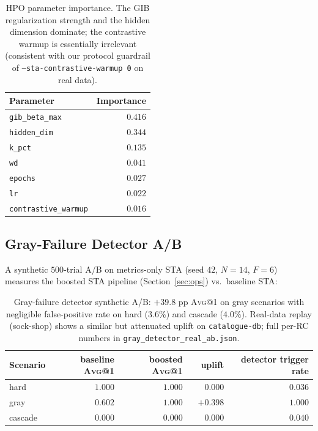 \documentclass[11pt,a4paper]{article}
\makeatletter
\newcommand{\Avg}[1]{\textsc{Avg}@{#1}}
\newcommand{\STA}{\textsc{STA}}
\makeatother
\begin{document}
\begin{table}[h]
\centering\small
\begin{tabular}{lr}
\toprule
\textbf{Parameter} & \textbf{Importance} \\
\midrule
\texttt{gib\_beta\_max} & $0.416$ \\
\texttt{hidden\_dim}    & $0.344$ \\
\texttt{k\_pct}         & $0.135$ \\
\texttt{wd}             & $0.041$ \\
\texttt{epochs}         & $0.027$ \\
\texttt{lr}             & $0.022$ \\
\texttt{contrastive\_warmup} & $0.016$ \\
\bottomrule
\end{tabular}
\caption{HPO parameter importance. The GIB regularization strength and the
hidden dimension dominate; the contrastive warmup is essentially irrelevant
(consistent with our protocol guardrail of \texttt{--sta-contrastive-warmup 0}
on real data).}
\label{tab:hpo}
\end{table}

\subsection{Gray-Failure Detector A/B}

A synthetic $500$-trial A/B on metrics-only \STA{} (seed $42$, $N{=}14$,
$F{=}6$) measures the boosted \STA{} pipeline (Section~\ref{sec:ops}) vs.\
baseline \STA{}:

\begin{table}[h]
\centering\small
\begin{tabular}{lrrrr}
\toprule
\textbf{Scenario} & \textbf{baseline \Avg{1}} & \textbf{boosted \Avg{1}} & \textbf{uplift} & \textbf{detector trigger rate} \\
\midrule
hard    & $1.000$ & $1.000$ & $\phantom{+0.}0.000$       & $0.036$ \\
gray    & $0.602$ & $1.000$ & $\mathbf{+0.398}$          & $1.000$ \\
cascade & $0.000$ & $0.000$ & $\phantom{+0.}0.000$       & $0.040$ \\
\bottomrule
\end{tabular}
\caption{Gray-failure detector synthetic A/B: $+39.8$ pp \Avg{1} on gray
scenarios with negligible false-positive rate on hard ($3.6\%$) and cascade
($4.0\%$). Real-data replay (sock-shop) shows a similar but attenuated
uplift on \texttt{catalogue-db}; full per-RC numbers in
\texttt{gray\_detector\_real\_ab.json}.}
\label{tab:graydetect}
\end{table}
\end{document}
